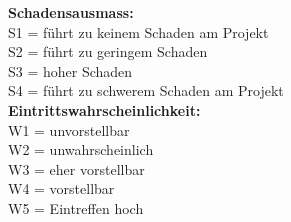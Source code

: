 \textbf{Schadensausmass:} \\
S1 = führt zu keinem Schaden am Projekt \\
S2 = führt zu geringem Schaden \\
S3 = hoher Schaden \\
S4 = führt zu schwerem Schaden am Projekt  \\

\textbf{Eintrittswahrscheinlichkeit:} \\
W1 = unvorstellbar \\
W2 = unwahrscheinlich \\
W3 = eher vorstellbar \\
W4 = vorstellbar \\
W5 = Eintreffen hoch \\

\restoregeometry
\riskvalues



